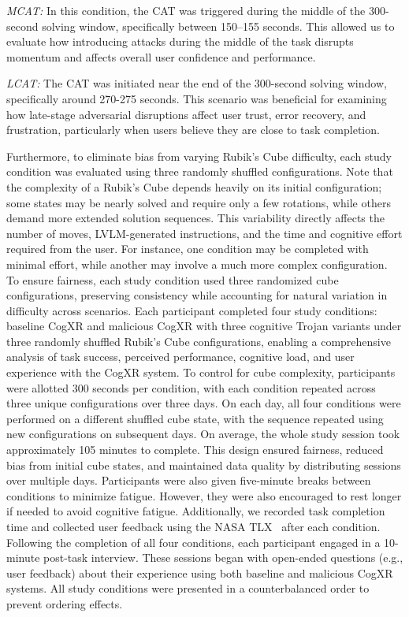 \documentclass[sigconf,review,anonymous]{acmart}
\begin{document}
\textit{MCAT:} In this condition, the CAT was triggered during the middle of the 300-second solving window, specifically between 150–155 seconds. This allowed us to evaluate how introducing attacks during the middle of the task disrupts momentum and affects overall user confidence and performance.

\textit{LCAT:} The CAT was initiated near the end of the 300-second solving window, specifically around 270-275 seconds. This scenario was beneficial for examining how late-stage adversarial disruptions affect user trust, error recovery, and frustration, particularly when users believe they are close to task completion.

Furthermore, to eliminate bias from varying Rubik’s Cube difficulty, each study condition was evaluated using three randomly shuffled configurations. Note that the complexity of a Rubik’s Cube depends heavily on its initial configuration; some states may be nearly solved and require only a few rotations, while others demand more extended solution sequences. This variability directly affects the number of moves, LVLM-generated instructions, and the time and cognitive effort required from the user. For instance, one condition may be completed with minimal effort, while another may involve a much more complex configuration. To ensure fairness, each study condition used three randomized cube configurations, preserving consistency while accounting for natural variation in difficulty across scenarios. Each participant completed four study conditions: baseline CogXR and malicious CogXR with three cognitive Trojan variants under three randomly shuffled Rubik’s Cube configurations, enabling a comprehensive analysis of task success, perceived performance, cognitive load, and user experience with the CogXR system. To control for cube complexity, participants were allotted 300 seconds per condition, with each condition repeated across three unique configurations over three days. On each day, all four conditions were performed on a different shuffled cube state, with the sequence repeated using new configurations on subsequent days.  On average, the whole study session took approximately 105 minutes to complete. This design ensured fairness, reduced bias from initial cube states, and maintained data quality by distributing sessions over multiple days. Participants were also given five-minute breaks between conditions to minimize fatigue. However, they were also encouraged to rest longer if needed to avoid cognitive fatigue. Additionally, we recorded task completion time and collected user feedback using the NASA TLX~\cite{hart1988development} after each condition. Following the completion of all four conditions, each participant engaged in a 10-minute post-task interview. These sessions began with open-ended questions (e.g., user feedback) about their experience using both baseline and malicious CogXR systems. All study conditions were presented in a counterbalanced order to prevent ordering effects.
\end{document}

